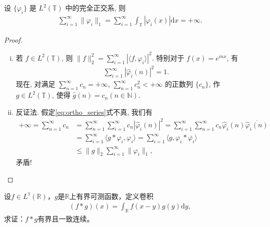 \documentclass[../../main.tex]{subfiles}%
\begin{document}
\begin{example}
设 $\{\varphi_i\}$ 是 $L^2(\mathbb{T})$ 中的完全正交系, 则
\begin{align}
\sum\limits_{i=1}^\infty \|\varphi_i\|_1 = \sum\limits_{i=1}^\infty \int_{\mathbb{T}} |\varphi_i(x)| \mathrm{d}x = +\infty.
\label{eq:ortho_series}
\end{align}
\end{example}
\begin{proof}
\begin{enumerate}[(i)]
\item 若 $f\in L^2(\mathbb{T})$, 则 $\|f\|_2^2 = \sum\limits_{i=1}^\infty |\langle f,\varphi_i\rangle|^2$. 特别对于 $f(x)=e^{inx}$, 有
\begin{align*}
\sum\limits_{i=1}^\infty |\hat{\varphi}_i(n)|^2 = 1.
\end{align*}
现在, 对满足 $\sum\limits_{n=1}^\infty c_n=+\infty$, $\sum\limits_{n=1}^\infty c_n^2<+\infty$ 的正数列 $\{c_n\}$, 作 $g\in L^2(\mathbb{T})$, 使得 $\hat{g}(n)=c_n(n\in \mathbb{N})$.

\item 反证法. 假定\eqref{eq:ortho_series}式不真, 我们有
\begin{align*}
+\infty = \sum\limits_{n=1}^\infty c_n &= \sum\limits_{n=1}^\infty \sum\limits_{i=1}^\infty c_n |\hat{\varphi}_i(n)|^2 = \sum\limits_{i=1}^\infty \sum\limits_{n=1}^\infty c_n \hat{\varphi}_i(n) \overline{\hat{\varphi}_i(n)} \\
&= \sum\limits_{i=1}^\infty \langle g*\varphi_i,\varphi_i\rangle = \sum\limits_{i=1}^\infty \langle g,\varphi_i * \overline{\varphi_i}\rangle \\
&\leqslant \|g\|_2 \sum\limits_{i=1}^\infty \|\varphi_i\|_1,
\end{align*}
矛盾!
\end{enumerate}
\end{proof}

\begin{example}
设$f \in L^1(\mathbb{R})$，$g$是$\mathbb{R}$上有界可测函数，定义卷积
\begin{align*}
(f * g)(x) = \int_{\mathbb{R}} f(x - y)g(y)\mathrm{d}y,
\end{align*}
求证：$f * g$有界且一致连续。
\end{example}
\end{document}
